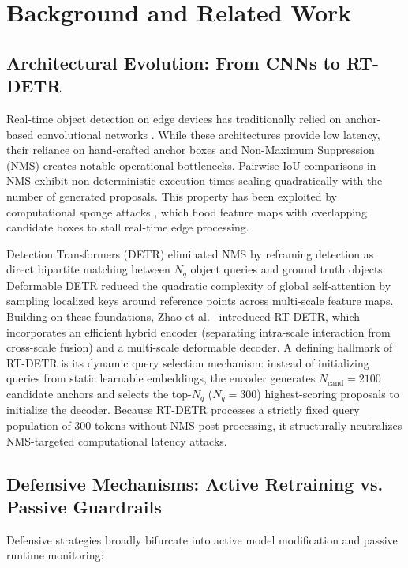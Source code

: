 \documentclass[preprint,12pt]{elsarticle}
\begin{document}
\section{Background and Related Work}
\label{sec:related_work}

\subsection{Architectural Evolution: From CNNs to RT-DETR}
Real-time object detection on edge devices has traditionally relied on anchor-based convolutional networks \citep{redmon2016you, bochkovskiy2020yolov4, wang2023yolov7}. While these architectures provide low latency, their reliance on hand-crafted anchor boxes and Non-Maximum Suppression (NMS) creates notable operational bottlenecks. Pairwise IoU comparisons in NMS exhibit non-deterministic execution times scaling quadratically with the number of generated proposals. This property has been exploited by computational sponge attacks \citep{chen2023overload, cina2022phantom}, which flood feature maps with overlapping candidate boxes to stall real-time edge processing.

Detection Transformers (DETR) \citep{carion2020end} eliminated NMS by reframing detection as direct bipartite matching between $N_q$ object queries and ground truth objects. Deformable DETR \citep{zhu2020deformable} reduced the quadratic complexity of global self-attention by sampling localized keys around reference points across multi-scale feature maps. Building on these foundations, Zhao et al.~\citep{zhao2024detrs} introduced RT-DETR, which incorporates an efficient hybrid encoder (separating intra-scale interaction from cross-scale fusion) and a multi-scale deformable decoder. A defining hallmark of RT-DETR is its dynamic query selection mechanism: instead of initializing queries from static learnable embeddings, the encoder generates $N_{\mathrm{cand}} = 2100$ candidate anchors and selects the top-$N_q$ ($N_q = 300$) highest-scoring proposals to initialize the decoder. Because RT-DETR processes a strictly fixed query population of 300 tokens without NMS post-processing, it structurally neutralizes NMS-targeted computational latency attacks.

\subsection{Defensive Mechanisms: Active Retraining vs. Passive Guardrails}
Defensive strategies broadly bifurcate into active model modification and passive runtime monitoring:
\end{document}
